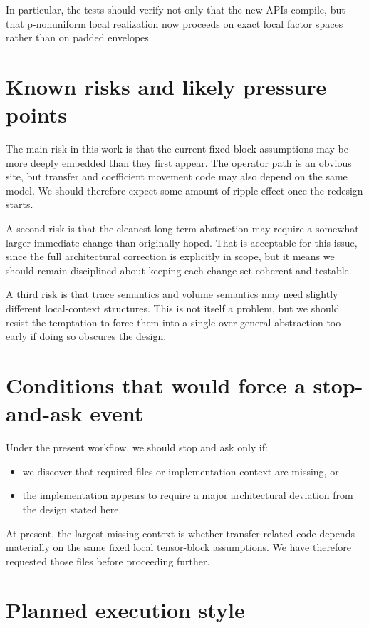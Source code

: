 \documentclass[11pt]{article}
\begin{document}
In particular, the tests should verify not only that the new APIs compile, but that p-nonuniform local realization now proceeds on exact local factor spaces rather than on padded envelopes.

\section{Known risks and likely pressure points}

The main risk in this work is that the current fixed-block assumptions may be more deeply embedded than they first appear.  The operator path is an obvious site, but transfer and coefficient movement code may also depend on the same model.  We should therefore expect some amount of ripple effect once the redesign starts.

A second risk is that the cleanest long-term abstraction may require a somewhat larger immediate change than originally hoped.  That is acceptable for this issue, since the full architectural correction is explicitly in scope, but it means we should remain disciplined about keeping each change set coherent and testable.

A third risk is that trace semantics and volume semantics may need slightly different local-context structures.  This is not itself a problem, but we should resist the temptation to force them into a single over-general abstraction too early if doing so obscures the design.

\section{Conditions that would force a stop-and-ask event}

Under the present workflow, we should stop and ask only if:

\begin{itemize}[leftmargin=2em]
\item we discover that required files or implementation context are missing, or
\item the implementation appears to require a major architectural deviation from the design stated here.
\end{itemize}

At present, the largest missing context is whether transfer-related code depends materially on the same fixed local tensor-block assumptions.  We have therefore requested those files before proceeding further.

\section{Planned execution style}
\end{document}
